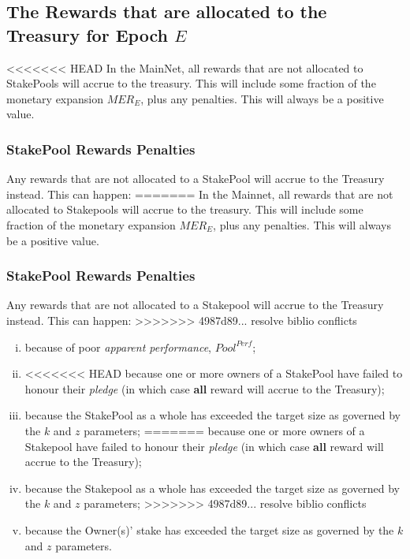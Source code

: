 \documentclass[11pt,a4paper,dvipsnames,twosided,final]{article}
\newcommand{\khcomment}[1]{\todo[color=blue!20]{KH: #1}}
\begin{document}
\clearpage
\subsection{The Rewards that are allocated to the Treasury for Epoch $E$}

<<<<<<< HEAD
In the MainNet, all rewards that are not allocated to StakePools will accrue to the treasury.  This will include some fraction of the
monetary expansion $\textit{MER}_E$, plus any penalties.  This will always be a positive value.

\subsubsection*{StakePool Rewards Penalties}
\label{sec:penalties}

Any rewards that are not allocated to a StakePool will accrue to the Treasury instead.  This can happen: %
=======
In the Mainnet, all rewards that are not allocated to Stakepools will accrue to the treasury.  This will include some fraction of the
monetary expansion $\textit{MER}_E$, plus any penalties.  This will always be a positive value.

\subsubsection*{StakePool Rewards Penalties}

Any rewards that are not allocated to a Stakepool will accrue to the Treasury instead.  This can happen: %
>>>>>>> 4987d89... resolve biblio conflicts

\begin{enumerate}[i)]
\item
  because of poor \emph{apparent performance}, $\textit{Pool}^{\textit{Perf}}$;
\item
<<<<<<< HEAD
  because one or more owners of a StakePool have failed to honour their \emph{pledge} (in which case \textbf{all} reward will accrue to the Treasury);
\item
  because the StakePool as a whole has exceeded the target size as governed by the $k$ and $z$ parameters;
=======
  because one or more owners of a Stakepool have failed to honour their \emph{pledge} (in which case \textbf{all} reward will accrue to the Treasury);
\item
  because the Stakepool as a whole has exceeded the target size as governed by the $k$ and $z$ parameters;
>>>>>>> 4987d89... resolve biblio conflicts
\item
  because the Owner(s)' stake has exceeded the target size as governed by the $k$ and $z$ parameters.
\end{enumerate}
\end{document}
